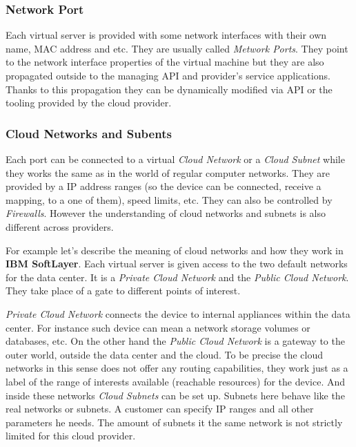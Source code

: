 \subsubsection{Network Port}
\label{subs:Network Port}

Each virtual server is provided with some network interfaces with their own name, MAC address and etc. They are usually called \emph{Metwork Ports}. They point to the network interface properties of the virtual machine but they are also propagated outside to the managing API and provider's service applications. Thanks to this propagation they can be dynamically modified via API or the tooling provided by the cloud provider.

\subsubsection{Cloud Networks and Subents}
\label{subs:Cloud Networks and Subents}

Each port can be connected to a virtual \emph{Cloud Network} or a \emph{Cloud Subnet} while they works the same as in the world of regular computer networks. They are provided by a IP address ranges (so the device can be connected, receive a mapping, to a one of them), speed limits, etc. They can also be controlled by \emph{Firewalls}. However the understanding of cloud networks and subnets is also different across providers.

For example let's describe the meaning of cloud networks and how they work in \textbf{IBM SoftLayer}. Each virtual server is given access to the two default networks for the data center. It is a \emph{Private Cloud Network} and the \emph{Public Cloud Network}. They take place of a gate to different points of interest.

\emph{Private Cloud Network} connects the device to internal appliances within the data center. For instance such device can mean a network storage volumes or databases, etc. On the other hand the \emph{Public Cloud Network} is a gateway to the outer world, outside the data center and the cloud. To be precise the cloud networks in this sense does not offer any routing capabilities, they work just as a label of the range of interests available (reachable resources) for the device. And inside these networks \emph{Cloud Subnets} can be set up. Subnets here behave like the real networks or subnets. A customer can specify IP ranges and all other parameters he needs. The amount of subnets it the same network is not strictly limited for this cloud provider.

